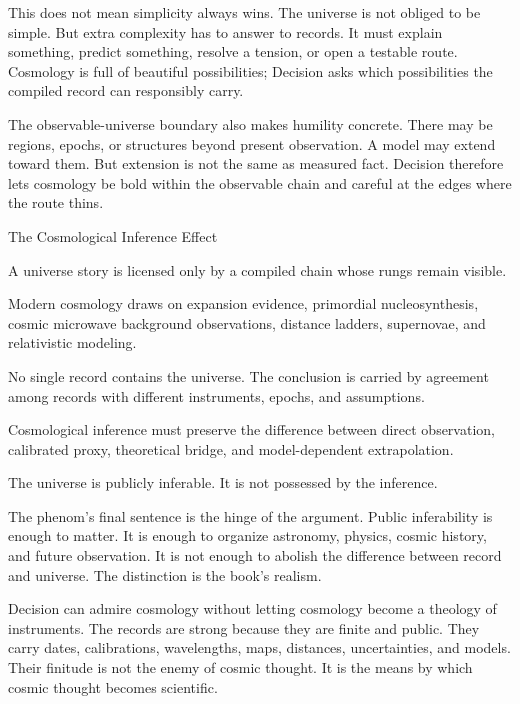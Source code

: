 This does not mean simplicity always wins. The universe is not obliged to be
simple. But extra complexity has to answer to records. It must explain
something, predict something, resolve a tension, or open a testable route.
Cosmology is full of beautiful possibilities; Decision asks which
possibilities the compiled record can responsibly carry.

The observable-universe boundary also makes humility concrete. There may be
regions, epochs, or structures beyond present observation. A model may extend
toward them. But extension is not the same as measured fact. Decision
therefore lets cosmology be bold within the observable chain and careful at
the edges where the route thins.

\begin{phenom}{The Cosmological Inference Effect~\cite{alpher1948,hubble1929,penzias1965,perlmutter1999,riess1998}}
\label{ph:cosmological-inference}

\PhStatement
A universe story is licensed only by a compiled chain whose rungs remain
visible.

\PhOrigin
Modern cosmology draws on expansion evidence, primordial nucleosynthesis,
cosmic microwave background observations, distance ladders, supernovae, and
relativistic modeling.

\PhObservation
No single record contains the universe. The conclusion is carried by agreement
among records with different instruments, epochs, and assumptions.

\PhConstraint
Cosmological inference must preserve the difference between direct observation,
calibrated proxy, theoretical bridge, and model-dependent extrapolation.

\PhConsequence
The universe is publicly inferable. It is not possessed by the inference.
\end{phenom}

The phenom's final sentence is the hinge of the argument. Public
inferability is enough to matter. It is enough to organize astronomy, physics,
cosmic history, and future observation. It is not enough to abolish the
difference between record and universe. The distinction is the book's
realism.

Decision can admire cosmology without letting cosmology become a theology of
instruments. The records are strong because they are finite and
public. They carry dates, calibrations, wavelengths, maps, distances,
uncertainties, and models. Their finitude is not the enemy of cosmic thought.
It is the means by which cosmic thought becomes scientific.

